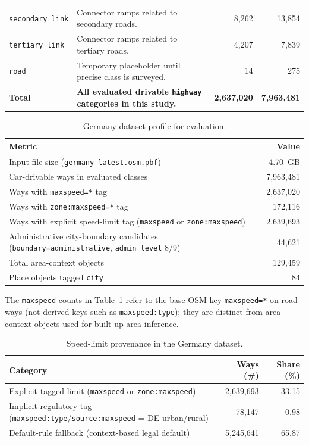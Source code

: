 \documentclass{article}
\begin{document}
\begin{table}[!htbp]
\begin{tabular}{p{1.8cm}p{5.2cm}rr}
\texttt{secondary\_link} & Connector ramps related to secondary roads. & 8{,}262 & 13{,}854 \\
\texttt{tertiary\_link} & Connector ramps related to tertiary roads. & 4{,}207 & 7{,}839 \\
\texttt{road} & Temporary placeholder until precise class is surveyed. & 14 & 275 \\
\midrule
\textbf{Total} & \textbf{All evaluated drivable \texttt{highway} categories in this study.} & \textbf{2{,}637{,}020} & \textbf{7{,}963{,}481} \\
\bottomrule
\end{tabular}
\normalsize
\end{table}

\begin{table}[!htbp]
\centering
\caption{Germany dataset profile for evaluation.}
\label{tab:dataset_profile}
\begin{tabular}{p{7.8cm}r}
\toprule
Metric & Value \\
\midrule
Input file size (\texttt{germany-latest.osm.pbf}) & \SI{4.70}{GB} \\
Car-drivable ways in evaluated classes & 7{,}963{,}481 \\
Ways with \texttt{maxspeed=*} tag & 2{,}637{,}020 \\
Ways with \texttt{zone:maxspeed=*} tag & 172{,}116 \\
Ways with explicit speed-limit tag (\texttt{maxspeed} or \texttt{zone:maxspeed}) & 2{,}639{,}693 \\
Administrative city-boundary candidates (\texttt{boundary=administrative}, \texttt{admin\_level} 8/9) & 44{,}621 \\
Total area-context objects & 129{,}459 \\
Place objects tagged \texttt{city} & 84 \\
\bottomrule
\end{tabular}
\end{table}

The \texttt{maxspeed} counts in Table~\ref{tab:dataset_profile} refer to the base OSM key \texttt{maxspeed=*} on road ways (not derived keys such as \texttt{maxspeed:type}); they are distinct from area-context objects used for built-up-area inference.

\begin{table}[!htbp]
\centering
\caption{Speed-limit provenance in the Germany dataset.}
\label{tab:speed_limit_provenance}
\begin{tabular}{lrr}
\toprule
Category & Ways (\#) & Share (\%) \\
\midrule
Explicit tagged limit (\texttt{maxspeed} or \texttt{zone:maxspeed}) & 2{,}639{,}693 & 33.15 \\
Implicit regulatory tag (\texttt{maxspeed:type}/\texttt{source:maxspeed} = DE urban/rural) & 78{,}147 & 0.98 \\
Default-rule fallback (context-based legal default) & 5{,}245{,}641 & 65.87 \\
\bottomrule
\end{tabular}
\end{table}
\end{document}
